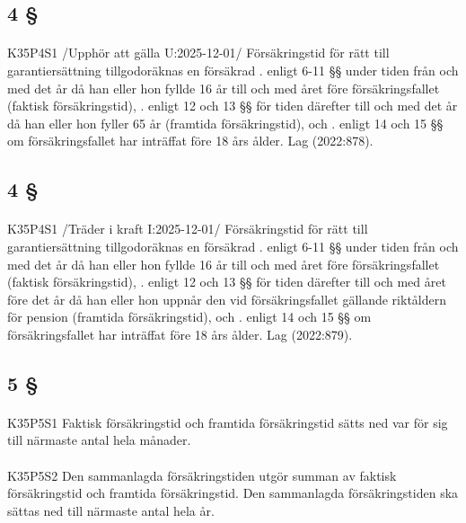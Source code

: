 \documentclass[a4paper,notitlepage,openany,10pt]{book}
\begin{document}
\subsection*{4 §}
\paragraph*{}
{\tiny K35P4S1}
/Upphör att gälla U:2025-12-01/
Försäkringstid för rätt till garantiersättning tillgodoräknas en försäkrad
. enligt 6-11 §§ under tiden från och med det år då han eller hon fyllde 16 år till och med året före försäkringsfallet (faktisk försäkringstid),
. enligt 12 och 13 §§ för tiden därefter till och med det år då han eller hon fyller 65 år (framtida försäkringstid), och
. enligt 14 och 15 §§ om försäkringsfallet har inträffat före 18 års ålder.
Lag (2022:878).
\subsection*{4 §}
\paragraph*{}
{\tiny K35P4S1}
/Träder i kraft I:2025-12-01/
Försäkringstid för rätt till garantiersättning tillgodoräknas en försäkrad
. enligt 6-11 §§ under tiden från och med det år då han eller hon fyllde 16 år till och med året före försäkringsfallet (faktisk försäkringstid),
. enligt 12 och 13 §§ för tiden därefter till och med året före det år då han eller hon uppnår den vid försäkringsfallet gällande riktåldern för pension (framtida försäkringstid), och
. enligt 14 och 15 §§ om försäkringsfallet har inträffat före 18 års ålder.
Lag (2022:879).
\subsection*{5 §}
\paragraph*{}
{\tiny K35P5S1}
Faktisk försäkringstid och framtida försäkringstid sätts ned var för sig till närmaste antal hela månader.
\paragraph*{}
{\tiny K35P5S2}
Den sammanlagda försäkringstiden utgör summan av faktisk försäkringstid och framtida försäkringstid. Den sammanlagda försäkringstiden ska sättas ned till närmaste antal hela år.
\end{document}
